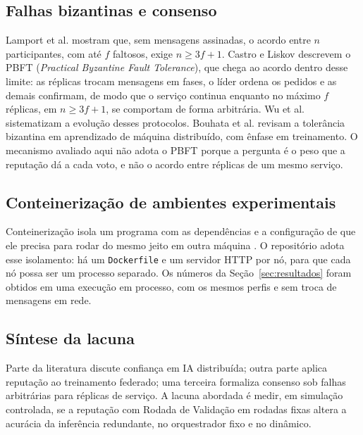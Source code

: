 \documentclass[12pt]{article}
\begin{document}
\subsection{Falhas bizantinas e consenso}
\label{sec:eixo-bft}

Lamport et al. \cite{lamport1982} mostram que, sem mensagens assinadas, o acordo entre $n$ participantes, com até $f$ faltosos, exige $n \geq 3f+1$. Castro e Liskov \cite{castro1999} descrevem o PBFT (\textit{Practical Byzantine Fault Tolerance}), que chega ao acordo dentro desse limite: as réplicas trocam mensagens em fases, o líder ordena os pedidos e as demais confirmam, de modo que o serviço continua enquanto no máximo $f$ réplicas, em $n \geq 3f+1$, se comportam de forma arbitrária. Wu et al. \cite{wu2024} sistematizam a evolução desses protocolos. Bouhata et al. \cite{bouhata2025} revisam a tolerância bizantina em aprendizado de máquina distribuído, com ênfase em treinamento. O mecanismo avaliado aqui não adota o PBFT porque a pergunta é o peso que a reputação dá a cada voto, e não o acordo entre réplicas de um mesmo serviço.

\subsection{Conteinerização de ambientes experimentais}
\label{sec:eixo-docker}

Conteinerização isola um programa com as dependências e a configuração de que ele precisa para rodar do mesmo jeito em outra máquina \cite{docker2026,burns2022}. O repositório adota esse isolamento: há um \texttt{Dockerfile} e um servidor HTTP por nó, para que cada nó possa ser um processo separado. Os números da Seção~\ref{sec:resultados} foram obtidos em uma execução em processo, com os mesmos perfis e sem troca de mensagens em rede.

\subsection{Síntese da lacuna}
\label{sec:lacuna}

Parte da literatura discute confiança em IA distribuída; outra parte aplica reputação ao treinamento federado; uma terceira formaliza consenso sob falhas arbitrárias para réplicas de serviço. A lacuna abordada é medir, em simulação controlada, se a reputação com Rodada de Validação em rodadas fixas altera a acurácia da inferência redundante, no orquestrador fixo e no dinâmico.
\end{document}
